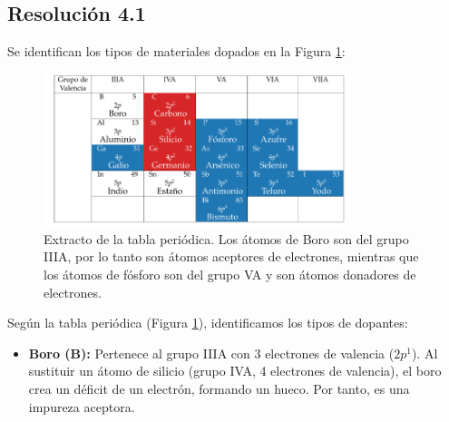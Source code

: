 \documentclass[
  11pt,
  letterpaper,
   addpoints,
  ]{exam}
\begin{document}
\begin{questions}
\begin{solution}
    \subsection*{Resolución 4.1}
Se identifican los tipos de materiales dopados en la Figura \ref{fig:tabla_periodica}:
    \begin{figure}[H]
        \centering
        \includegraphics[width=0.8\textwidth]{../figures/Auxiliar_2_8.png}
        \caption{Extracto de la tabla periódica. Los átomos de Boro son del grupo IIIA, por lo tanto son átomos aceptores de electrones, mientras que los átomos de fósforo son del grupo VA y son átomos donadores de electrones.}
        \label{fig:tabla_periodica}
    \end{figure}
Según la tabla periódica (Figura \ref{fig:tabla_periodica}), identificamos los tipos de dopantes:
    \begin{itemize}
        \item \textbf{Boro (B):} Pertenece al grupo IIIA con 3 electrones de valencia ($2p^1$). Al sustituir un átomo de silicio (grupo IVA, 4 electrones de valencia), el boro crea un déficit de un electrón, formando un hueco. Por tanto, es una impureza aceptora.
        

\end{itemize}
\end{solution}
\end{questions}
\end{document}
